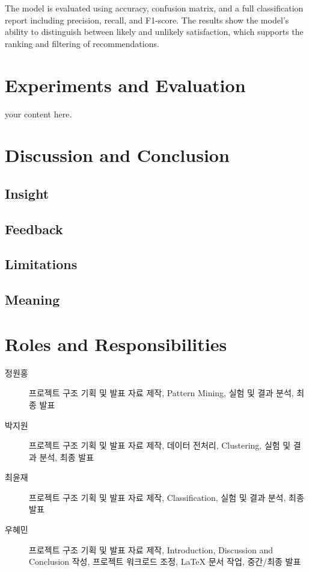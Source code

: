 \documentclass[sigconf]{acmart}
\begin{document}
\begin{CJK}{UTF8}{mj}
The model is evaluated using accuracy, confusion matrix, and a full classification report including precision, recall, and F1-score. The results show the model’s ability to distinguish between likely and unlikely satisfaction, which supports the ranking and filtering of recommendations.



\section{Experiments and Evaluation}%
your content here.

\section{Discussion and Conclusion}%
\subsection{Insight}
\subsection{Feedback}
\subsection{Limitations}
\subsection{Meaning}



\section{Roles and Responsibilities}
\begin{description}
  \item[정원홍] 프로젝트 구조 기획 및 발표 자료 제작, Pattern Mining, 실험 및 결과 분석, 최종 발표
  \item[박지원] 프로젝트 구조 기획 및 발표 자료 제작, 데이터 전처리, Clustering, 실험 및 결과 분석, 최종 발표
  \item[최윤재] 프로젝트 구조 기획 및 발표 자료 제작, Classification, 실험 및 결과 분석, 최종 발표
  \item[우혜민] 프로젝트 구조 기획 및 발표 자료 제작, Introduction, Discussion and Conclusion 작성, 프로젝트 워크로드 조정, LaTeX 문서 작업, 중간/최종 발표
\end{description}




\end{CJK}
\end{document}
